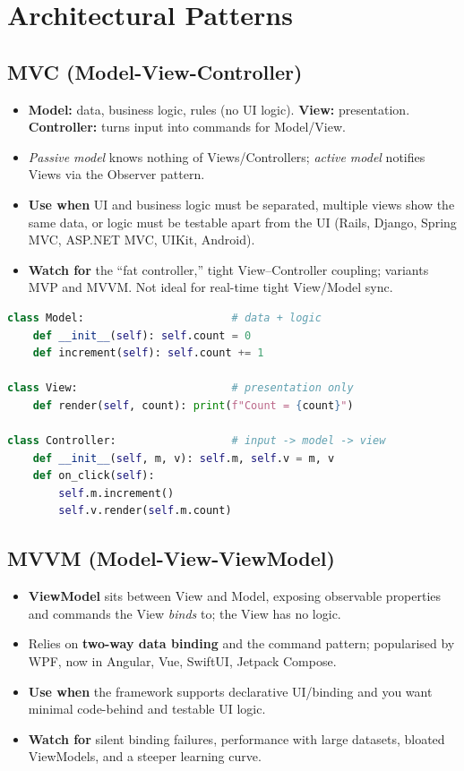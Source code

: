 \documentclass[hidelinks]{article}
\begin{document}
\section{Architectural Patterns}

\subsection{MVC (Model-View-Controller)}
\begin{itemize}
  \item \textbf{Model:} data, business logic, rules (no UI logic). \textbf{View:} presentation.
        \textbf{Controller:} turns input into commands for Model/View.
  \item \emph{Passive model} knows nothing of Views/Controllers; \emph{active model} notifies
        Views via the Observer pattern.
  \item \textbf{Use when} UI and business logic must be separated, multiple views show the same
        data, or logic must be testable apart from the UI (Rails, Django, Spring MVC, ASP.NET MVC,
        UIKit, Android).
  \item \textbf{Watch for} the ``fat controller,'' tight View--Controller coupling; variants MVP
        and MVVM. Not ideal for real-time tight View/Model sync.
\end{itemize}

\begin{lstlisting}[language=Python,caption={Minimal MVC (added)}]
class Model:                       # data + logic
    def __init__(self): self.count = 0
    def increment(self): self.count += 1

class View:                        # presentation only
    def render(self, count): print(f"Count = {count}")

class Controller:                  # input -> model -> view
    def __init__(self, m, v): self.m, self.v = m, v
    def on_click(self):
        self.m.increment()
        self.v.render(self.m.count)
\end{lstlisting}

\subsection{MVVM (Model-View-ViewModel)}
\begin{itemize}
  \item \textbf{ViewModel} sits between View and Model, exposing observable properties and commands
        the View \emph{binds} to; the View has no logic.
  \item Relies on \textbf{two-way data binding} and the command pattern; popularised by WPF, now in
        Angular, Vue, SwiftUI, Jetpack Compose.
  \item \textbf{Use when} the framework supports declarative UI/binding and you want minimal
        code-behind and testable UI logic.
  \item \textbf{Watch for} silent binding failures, performance with large datasets, bloated
        ViewModels, and a steeper learning curve.
\end{itemize}
\end{document}
